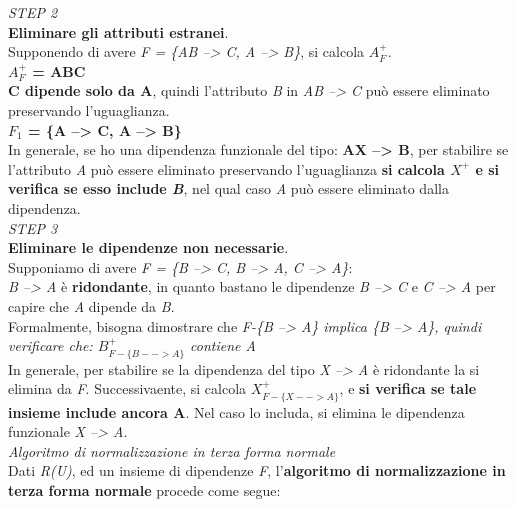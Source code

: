 \documentclass{article}
\begin{document}
\textit{STEP 2}\\
\textbf{Eliminare gli attributi estranei}.\vspace{14pt}\\
Supponendo di avere \textit{F = \{AB --> C, A --> B\}}, si calcola \textit{$A^+_F$}.\\
\textbf{\textit{$A^+_F$} = ABC}\\
\textbf{C dipende solo da A}, quindi l'attributo \textit{B} in \textit{AB --> C} può essere eliminato preservando l'uguaglianza.\\
\textbf{\textit{$F_1$} = \{A --> C, A --> B\}}\vspace{14pt}\\
In generale, se ho una dipendenza funzionale del tipo: \textbf{AX --> B}, per stabilire se l’attributo \textit{A} può essere eliminato preservando l’uguaglianza \textbf{si calcola \textit{$X^+$} e si verifica se esso include \textit{B}}, nel qual caso \textit{A} può essere eliminato dalla dipendenza.\vspace{14pt}\\
\textit{STEP 3}\\
\textbf{Eliminare le dipendenze non necessarie}.\vspace{14pt}\\
Supponiamo di avere \textit{F = \{B --> C, B --> A, C --> A\}}:\\
\textit{B --> A} è \textbf{ridondante}, in quanto bastano le dipendenze \textit{B --> C} e \textit{C --> A} per capire che \textit{A} dipende da \textit{B}.\\
Formalmente, bisogna dimostrare che \textit{F-\{B --> A\} implica \{B --> A\}, quindi verificare che: $B^+_{F-\{B --> A\}}$ contiene A}\vspace{14pt}\\
In generale, per stabilire se la dipendenza del tipo \textit{X --> A} è ridondante la si elimina da \textit{F}. Successivaente, si calcola $X^+_{F-\{X --> A\}}$, e \textbf{si verifica se tale insieme include ancora A}. Nel caso lo includa, si elimina le dipendenza funzionale \textit{X --> A}.\vspace{14pt}\\
\textit{Algoritmo di normalizzazione in terza forma normale}\\
Dati \textit{R(U)}, ed un insieme di dipendenze \textit{F}, l'\textbf{algoritmo di normalizzazione in terza forma normale} procede come segue:
\end{document}
